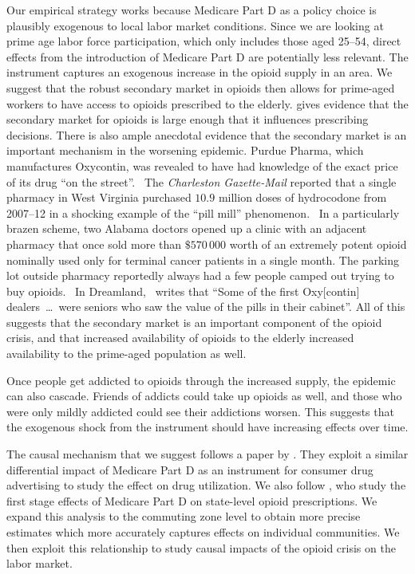 \documentclass[12pt]{article}
\begin{document}
Our empirical strategy works because Medicare Part D as a policy choice is plausibly exogenous to local labor market conditions.  Since we are looking at prime age labor force participation, which only includes those aged 25--54, direct effects from the introduction of Medicare Part D are potentially less relevant.  The instrument captures an exogenous increase in the opioid supply in an area.  We suggest that the robust secondary market in opioids then allows for prime-aged workers to have access to opioids prescribed to the elderly.  \textcite{schnell17} gives evidence that the secondary market for opioids is large enough that it influences prescribing decisions.  There is also ample anecdotal evidence that the secondary market is an important mechanism in the worsening epidemic.  Purdue Pharma, which manufactures Oxycontin, was revealed to have had knowledge of the exact price of its drug ``on the street''.~  The \emph{Charleston Gazette-Mail} reported that a single pharmacy in West Virginia purchased $10.9$ million doses of hydrocodone from 2007--12 in a shocking example of the ``pill mill'' phenomenon.~  In a particularly brazen scheme, two Alabama doctors opened up a clinic with an adjacent pharmacy that once sold more than $\$570\,000$ worth of an extremely potent opioid nominally used only for terminal cancer patients in a single month.  The parking lot outside pharmacy reportedly always had a few people camped out trying to buy opioids.~  In Dreamland,~ \citeauthor{dreamland} writes that ``Some of the first Oxy[contin] dealers\ \dots\ were seniors who saw the value of the pills in their cabinet''.  All of this suggests that the secondary market is an important component of the opioid crisis, and that increased availability of opioids to the elderly increased availability to the prime-aged population as well.

Once people get addicted to opioids through the increased supply, the epidemic can also cascade.  Friends of addicts could take up opioids as well, and those who were only mildly addicted could see their addictions worsen.  This suggests that the exogenous shock from the instrument should have increasing effects over time.

The causal mechanism that we suggest follows a paper by \textcite{alpert17}.  They exploit a similar differential impact of Medicare Part D as an instrument for consumer drug advertising to study the effect on drug utilization.  We also follow \textcite{powell15}, who study the first stage effects of Medicare Part D on state-level opioid prescriptions.  We expand this analysis to the commuting zone level to obtain more precise estimates which more accurately captures effects on individual communities.  We then exploit this relationship to study causal impacts of the opioid crisis on the labor market.
\end{document}
